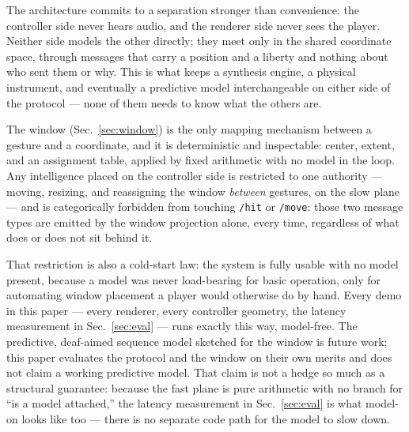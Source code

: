 
The architecture commits to a separation stronger than convenience: the
controller side never hears audio, and the renderer side never sees
the player. Neither side models the other directly; they meet only in
the shared coordinate space, through messages that carry a position
and a liberty and nothing about who sent them or why. This is what
keeps a synthesis engine, a physical instrument, and eventually a
predictive model interchangeable on either side of the protocol ---
none of them needs to know what the others are.

The window (Sec.~\ref{sec:window}) is the only mapping mechanism
between a gesture and a coordinate, and it is deterministic and
inspectable: center, extent, and an assignment table, applied by fixed
arithmetic with no model in the loop. Any intelligence placed on the
controller side is restricted to one authority --- moving, resizing,
and reassigning the window \emph{between} gestures, on the slow plane
--- and is categorically forbidden from touching \texttt{/hit} or
\texttt{/move}: those two message types are emitted by the window
projection alone, every time, regardless of what does or does not sit
behind it.

That restriction is also a cold-start law: the system is fully usable
with no model present, because a model was never load-bearing for
basic operation, only for automating window placement a player would
otherwise do by hand. Every demo in this paper --- every renderer,
every controller geometry, the latency measurement in
Sec.~\ref{sec:eval} --- runs exactly this way, model-free. The
predictive, deaf-aimed sequence model sketched for the window is future
work; this paper evaluates the protocol and the window on their own
merits and does not claim a working predictive model. That claim is
not a hedge so much as a structural guarantee: because the fast plane
is pure arithmetic with no branch for ``is a model attached,'' the
latency measurement in Sec.~\ref{sec:eval} is what model-on looks like
too --- there is no separate code path for the model to slow down.
